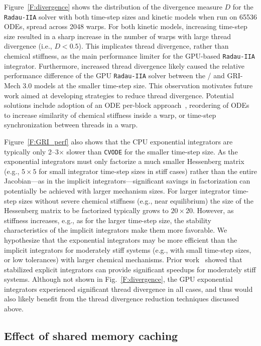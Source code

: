 \documentclass[final,twocolumn]{elsarticle}
\begin{document}
Figure~\ref{F:divergence} shows the distribution of the divergence measure $D$ for the \texttt{Radau-IIA} solver with both time-step sizes and kinetic models when run on \num{65536} ODEs, spread across \num{2048} warps.
For both kinetic models, increasing time-step size resulted in a sharp increase in the number of warps with large thread divergence (i.e., $D < 0.5$).
This implicates thread divergence, rather than chemical stiffness, as the main performance limiter for the GPU-based \texttt{Radau-IIA} integrator.
Furthermore, increased thread divergence likely caused the relative performance difference of the GPU \texttt{Radau-IIA} solver between the \slash{} and GRI-Mech 3.0 models at the smaller time-step size.
This observation motivates future work aimed at developing strategies to reduce thread divergence.
Potential solutions include adoption of an ODE per-block approach~\cite{Stone:2013aa}, reordering of ODEs to increase similarity of chemical stiffness inside a warp, or time-step synchronization between threads in a warp.

Figure~\ref{F:GRI_perf} also shows that the CPU exponential integrators are typically only \numrange{2}{3}$\times$ slower than \texttt{CVODE} for the smaller time-step size.
As the exponential integrators must only factorize a much smaller Hessenberg matrix (e.g., $5 \times 5$ for small integrator time-step sizes in stiff cases) rather than the entire Jacobian---as in the implicit integrators---significant savings in factorization can potentially be achieved with larger mechanism sizes.
For larger integrator time-step sizes without severe chemical stiffness (e.g., near equilibrium) the size of the Hessenberg matrix to be factorized typically grows to $20\times 20$.
However, as stiffness increases, e.g., as for the larger time-step size, the stability characteristics of the implicit integrators make them more favorable.
We hypothesize that the exponential integrators may be more efficient than the implicit integrators for moderately stiff systems (e.g., with small time-step sizes, or low tolerances) with larger chemical mechanisms.
Prior work~\cite{Niemeyer:2014aa} showed that stabilized explicit integrators can provide significant speedups for moderately stiff systems.
Although not shown in Fig.~\ref{F:divergence}, the GPU exponential integrators experienced significant thread divergence in all cases, and thus would also likely benefit from the thread divergence reduction techniques discussed above.

\subsection{Effect of shared memory caching}
\label{S:smem}
\end{document}
